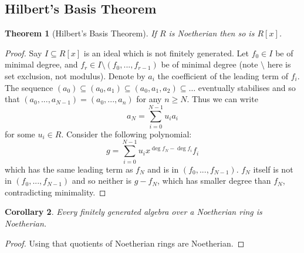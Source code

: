 \documentclass[12pt]{article}
\theoremstyle{plain}
\newtheorem{thm}{Theorem}[subsection] %
\newtheorem{cor}[thm]{Corollary}
\theoremstyle{definition}
\begin{document}
\subsection{Hilbert's Basis Theorem}
\begin{thm}[Hilbert's Basis Theorem]
If $R$ is Noetherian then so is $R[x]$.
\end{thm}
\begin{proof}
Say $I \subseteq R[x]$ is an ideal which is not finitely generated. Let $f_0 \in I$ be of minimal degree, and $f_r \in I\setminus(f_0,...,f_{r-1})$ be of minimal degree (note $\setminus$ here is set exclusion, not modulus). Denote by $a_i$ the coefficient of the leading term of $f_i$. The sequence $(a_0) \subseteq (a_0,a_1) \subseteq (a_0,a_1,a_2) \subseteq \hdots$ eventually stabilises and so that $(a_0,...,a_{N-1}) = (a_0,...,a_n)$ for any $n \geq N$. Thus we can write
\[a_N = \sum_{i = 0}^{N-1}u_i a_i\]
for some $u_i \in R$. Consider the following polynomial:
\[g = \sum_{i = 0}^{N-1}u_ix^{\operatorname{deg}f_N - \operatorname{deg}f_i}f_i\]
which has the same leading term as $f_N$ and is in $(f_0,...,f_{N-1})$. $f_N$ itself is not in $(f_0,...,f_{N-1})$ and so neither is $g - f_{N}$, which has smaller degree than $f_{N}$, contradicting minimality.
\end{proof}
\begin{cor}
Every finitely generated algebra over a Noetherian ring is Noetherian.
\end{cor}
\begin{proof}
Using that quotients of Noetherian rings are Noetherian.
\end{proof}
%
\end{document}
